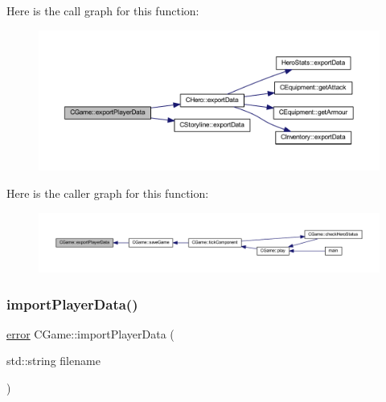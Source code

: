 Here is the call graph for this function\+:\nopagebreak
\begin{figure}[H]
\begin{center}
\leavevmode
\includegraphics[width=350pt]{class_c_game_a7d821ce9a0454653bbfde69979155da9_cgraph}
\end{center}
\end{figure}
Here is the caller graph for this function\+:\nopagebreak
\begin{figure}[H]
\begin{center}
\leavevmode
\includegraphics[width=350pt]{class_c_game_a7d821ce9a0454653bbfde69979155da9_icgraph}
\end{center}
\end{figure}
\mbox{\label{class_c_game_a507b71eeebc2a6aaa08d9e0dcb61c7ac}} 
\subsubsection{\texorpdfstring{import\+Player\+Data()}{importPlayerData()}}
{\footnotesize\ttfamily \mbox{\hyperlink{_errors_list_8h_af10dacfa214e2575bb2e0ee407c242e0}{error}} C\+Game\+::import\+Player\+Data (\begin{DoxyParamCaption}\item[{std\+::string}]{filename }\end{DoxyParamCaption})\hspace{0.3cm}{\ttfamily [protected]}}

